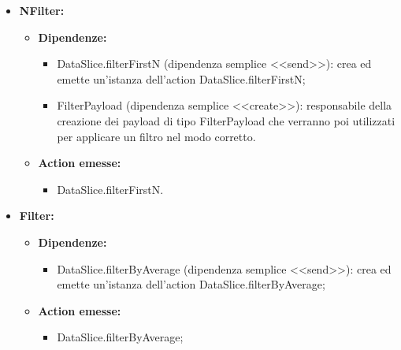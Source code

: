 \begin{itemize}
      \item \textbf{NFilter:}
            \begin{itemize}
                  \item \textbf{Dipendenze:}
                        \begin{itemize}
                              \item DataSlice.filterFirstN (dipendenza semplice <<send>>): crea ed emette
                                    un'istanza dell'action DataSlice.filterFirstN;
                              \item FilterPayload (dipendenza semplice <<create>>): responsabile della creazione
                                    dei payload di tipo FilterPayload che verranno poi utilizzati per applicare un
                                    filtro nel modo corretto.
                        \end{itemize}
                  \item \textbf{Action emesse:}
                        \begin{itemize}
                              \item DataSlice.filterFirstN.
                        \end{itemize}
            \end{itemize}

      \item \textbf{Filter:}
            \begin{itemize}
                  \item \textbf{Dipendenze:}
                        \begin{itemize}
                              \item DataSlice.filterByAverage (dipendenza semplice <<send>>): crea ed emette
                                    un'istanza dell'action DataSlice.filterByAverage;
                        \end{itemize}
                  \item \textbf{Action emesse:}
                        \begin{itemize}
                              \item DataSlice.filterByAverage;
                        \end{itemize}
            \end{itemize}


\end{itemize}
